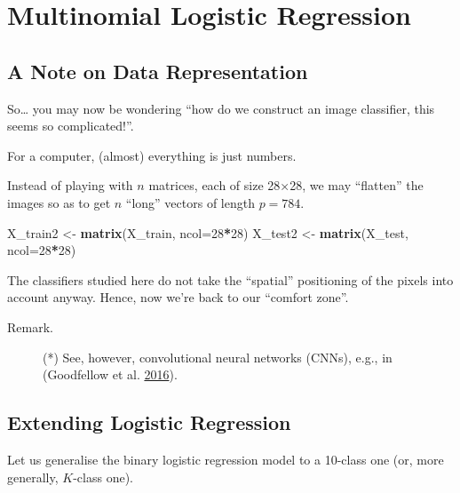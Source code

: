 \documentclass[10pt,b5paper,krantz1]{krantz}
\newenvironment{Shaded}{\begin{snugshade}}{\end{snugshade}}
\newcommand{\DataTypeTok}[1]{\textcolor[rgb]{0.27,0.27,0.27}{#1}}
\newcommand{\DecValTok}[1]{\textcolor[rgb]{0.06,0.06,0.06}{#1}}
\newcommand{\KeywordTok}[1]{\textcolor[rgb]{0.27,0.27,0.27}{\textbf{#1}}}
\newcommand{\NormalTok}[1]{#1}
\newcommand{\OperatorTok}[1]{\textcolor[rgb]{0.43,0.43,0.43}{\textbf{#1}}}
\newcommand{\StringTok}[1]{\textcolor[rgb]{0.5,0.5,0.5}{#1}}
\begin{document}
\hypertarget{multinomial-logistic-regression}{%
\section{Multinomial Logistic Regression}\label{multinomial-logistic-regression}}

\hypertarget{a-note-on-data-representation}{%
\subsection{A Note on Data Representation}\label{a-note-on-data-representation}}

So\ldots{} you may now be wondering ``how do we construct an image classifier,
this seems so complicated!''.

For a computer, (almost) everything is just numbers.

Instead of playing with \(n\) matrices, each of size 28×28,
we may ``flatten'' the images so as to get
\(n\) ``long'' vectors of length \(p=784\).

\begin{Shaded}
\begin{Highlighting}[]
\NormalTok{X_train2 <-}\StringTok{ }\KeywordTok{matrix}\NormalTok{(X_train, }\DataTypeTok{ncol=}\DecValTok{28}\OperatorTok{*}\DecValTok{28}\NormalTok{)}
\NormalTok{X_test2  <-}\StringTok{ }\KeywordTok{matrix}\NormalTok{(X_test, }\DataTypeTok{ncol=}\DecValTok{28}\OperatorTok{*}\DecValTok{28}\NormalTok{)}
\end{Highlighting}
\end{Shaded}

The classifiers studied here do not take the ``spatial'' positioning of
the pixels into account anyway. Hence, now we're back to our ``comfort zone''.

\begin{description}
\item[Remark.]
(*) See, however, convolutional neural networks (CNNs),
e.g., in (Goodfellow et al. \protect\hyperlink{ref-deeplearn}{2016}).
\end{description}

\hypertarget{extending-logistic-regression}{%
\subsection{Extending Logistic Regression}\label{extending-logistic-regression}}

Let us generalise the binary logistic regression model
to a 10-class one (or, more generally, \(K\)-class one).
\end{document}
